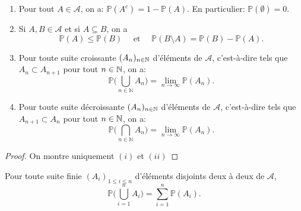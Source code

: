 \begin{proposition}
	\redspace
\begin{enumerate}[label=$(\roman*)$]

	\item Pour tout $A \in \mathcal{A}$, on a: $\mathbb{P} (A^c) = 1 - \mathbb{P} (A)$. En particulier: $\mathbb{P} (\emptyset) = 0$.



	\item Si $A,B \in \mathcal{A}$ et si $A \subseteq B$, on a
		\[ \mathbb{P} (A) \leq \mathbb{P} (B) \quad \textrm{ et } \quad  \mathbb{P} (B \setminus A) = \mathbb{P} (B) - \mathbb{P} (A).\]

	\item Pour toute suite croissante $(A_n)_{n \in \mathbb{N}}$ d'éléments de $\mathcal{A}$, c'est-à-dire tels que $A_n \subset A_{n+1}$ pour tout $n \in \mathbb{N}$, on a:
	\[ \mathbb{P} \Big( \bigcup_{n \in \mathbb{N}} A_n \Big) = \lim_{n \rightarrow \infty} \mathbb{P} (A_n) .\]

	\item Pour toute suite décroissante $(A_n)_{n \in \mathbb{N}}$ d'éléments de $\mathcal{A}$, c'est-à-dire tels que $A_{n+1} \subset A_n$ pour tout $n \in \mathbb{N}$, on a:
	\[ \mathbb{P} \Big( \bigcap_{n \in \mathbb{N}} A_n \Big) = \lim_{n \rightarrow \infty} \mathbb{P} (A_n) .\]
\end{enumerate}%
\end{proposition}
\begin{proof}
	On montre uniquement $(i)$ et $(ii)$
\pl{\rep{5cm}}
\end{proof}

\sld{\vfill\pagebreak[5]}%


\begin{proposition}
Pour toute suite finie $(A_i)_{1 \leq i \leq n}$ d'éléments disjoints deux à deux de $\mathcal{A}$,
	$$ \mathbb{P} \Big( \bigcup_{i=1}^n A_i \Big) = \sum_{i=1}^n \mathbb{P} (A_i) .$$
\end{proposition}

